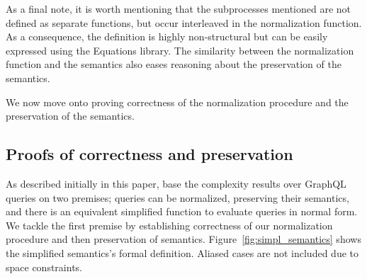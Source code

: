 
\iffalse
\begin{verbatim}
 Definition normalize_queries (s : wfGraphQLSchema)
                             (type_in_scope : Name)
                             (queries : seq Query) :
                                         seq Query :=
    if is_object_type s type_in_scope then
        normalize s type_in_scope queries
    else
        [seq on t { normalize s t queries } |
            t <- get_possible_types s type_in_scope].

\end{verbatim}
\fi

As a final note, it is worth mentioning that the subprocesses mentioned are not defined as separate functions, but occur interleaved in the normalization function. As a consequence, the definition is highly non-structural but can be easily expressed using the Equations library. The  similarity between the normalization function and the semantics also eases reasoning about the preservation of the semantics. 

We now move onto proving correctness of the normalization procedure and the preservation of the semantics.



\subsection{Proofs of correctness and preservation}

As described initially in this paper, \HP{} base the complexity results over GraphQL queries on two premises; queries can be normalized, preserving their semantics, and there is an equivalent simplified function to evaluate queries in normal form. We tackle the first premise by establishing correctness of our normalization procedure and then preservation of semantics. Figure~\ref{fig:simpl_semantics} shows the simplified semantics's formal definition. Aliased cases are not included due to space constraints.

